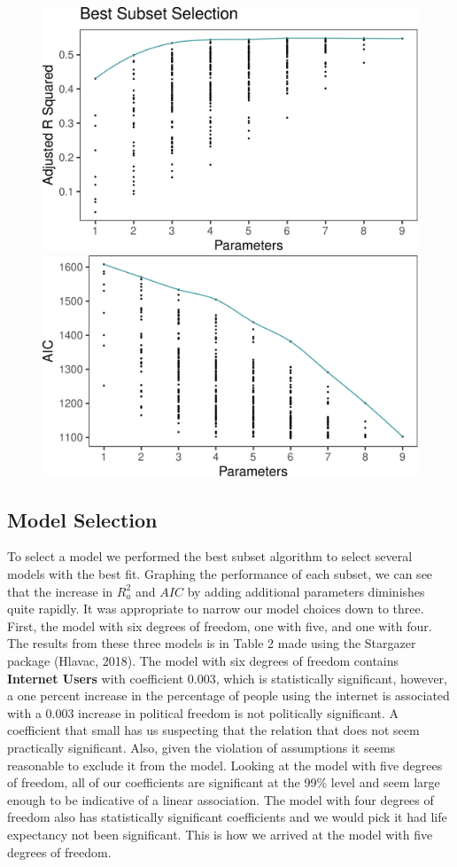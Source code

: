 \documentclass[
  english,
  man,floatsintext]{apa6}
\begin{document}
\begin{figure}
\includegraphics[width=0.5\linewidth]{paper_files/figure-latex/unnamed-chunk-3-1} \includegraphics[width=0.5\linewidth]{paper_files/figure-latex/unnamed-chunk-3-2} \caption{ }\label{fig:unnamed-chunk-3}
\end{figure}

\hypertarget{model-selection}{%
\subsection{Model Selection}\label{model-selection}}

To select a model we performed the best subset algorithm to select several models with the best fit. Graphing the performance of each subset, we can see that the increase in \(R^{2}_a\) and \(AIC\) by adding additional parameters diminishes quite rapidly. It was appropriate to narrow our model choices down to three. First, the model with six degrees of freedom, one with five, and one with four. The results from these three models is in Table 2 made using the Stargazer package (Hlavac, 2018). The model with six degrees of freedom contains \textbf{Internet Users} with coefficient 0.003, which is statistically significant, however, a one percent increase in the percentage of people using the internet is associated with a 0.003 increase in political freedom is not politically significant. A coefficient that small has us suspecting that the relation that does not seem practically significant. Also, given the violation of assumptions it seems reasonable to exclude it from the model. Looking at the model with five degrees of freedom, all of our coefficients are significant at the 99\% level and seem large enough to be indicative of a linear association. The model with four degrees of freedom also has statistically significant coefficients and we would pick it had life expectancy not been significant. This is how we arrived at the model with five degrees of freedom.
\end{document}
